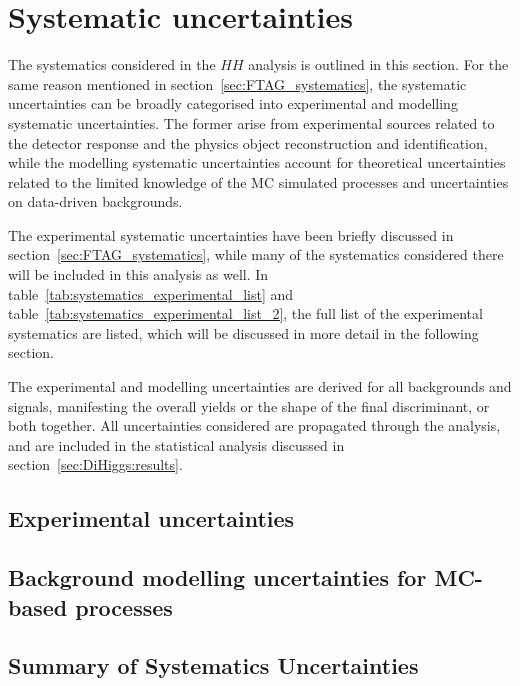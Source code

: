 \section{Systematic uncertainties}
The systematics considered in the $HH$ analysis
is outlined in this section. For the same reason 
mentioned in section~\ref{sec:FTAG_systematics}, 
the systematic uncertainties can be broadly categorised
into experimental and modelling systematic uncertainties. 
The former arise from experimental sources related to the detector 
response and the physics object reconstruction and identification,
while the modelling systematic uncertainties account for 
theoretical uncertainties related to the limited 
knowledge of the MC simulated processes 
and uncertainties on data-driven backgrounds. 

The experimental systematic uncertainties have been 
briefly discussed in section~\ref{sec:FTAG_systematics},
while many of the systematics considered there will
be included in this analysis as well. 
In table~\ref{tab:systematics_experimental_list} 
and table~\ref{tab:systematics_experimental_list_2}, the full list
of the experimental systematics are listed, 
which will be discussed in more detail in the following section.  

The experimental and modelling uncertainties are derived for 
all backgrounds and signals, manifesting the overall yields
or the shape of the final discriminant, or both together.
All uncertainties considered are propagated through the analysis,
and are included in the statistical analysis
discussed in section~\ref{sec:DiHiggs:results}.


\subsection{Experimental uncertainties}
\label{sec:systematics_experimental}





\subsection{Background modelling uncertainties for MC-based processes}
\label{sec:systematics_backgroundmodelling}




\subsection{Summary of Systematics Uncertainties}

